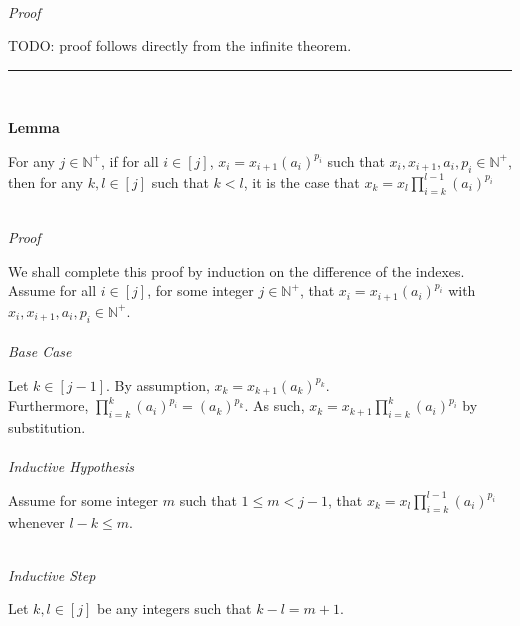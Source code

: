 \documentclass[a4paper,12pt]{article}
\begin{document}
\noindent \\
\textit{Proof}

\noindent TODO: proof follows directly from the infinite theorem.


\begin{center}
\noindent\rule{8cm}{0.4pt}
\end{center}
\noindent \\






\label{lemma:closed_form_of_factorization}
\hypertarget{lemma:closed_form_of_factorization}{}
\begin{tcolorbox}
\textbf{Lemma}

For any $j \in \mathbb{N}^+$, if for all $i \in [j]$, $x_i = x_{i + 1}(a_i)^{p_i}$ such that $x_i, x_{i + 1}, a_i, p_i \in \mathbb{N}^+$, then for any $k, l \in [j]$ such that $k < l$, it is the case that $\displaystyle x_k = x_l \prod_{i = k}^{l - 1} (a_i)^{p_i}$
\end{tcolorbox}

\noindent\\
\textit{Proof}

\noindent We shall complete this proof by induction on the difference of the indexes.\\

\noindent Assume for all $i \in [j]$, for some integer $j \in \mathbb{N}^+$, that $x_i = x_{i + 1}(a_i)^{p_i}$ with $x_i, x_{i + 1}, a_i, p_i \in \mathbb{N}^+$.\\

\noindent\\
\textit{Base Case}

\noindent Let $k \in [j - 1]$. By assumption, $x_k = x_{k + 1}(a_k)^{p_k}$.\\

\noindent Furthermore, $\displaystyle \prod_{i = k}^{k}(a_i)^{p_i} = (a_k)^{p_k}$. As such, $\displaystyle x_k = x_{k + 1} \prod_{i = k}^{k}(a_i)^{p_i}$ by substitution.\\


\noindent \\
\textit{Inductive Hypothesis}

\noindent Assume for some integer $m$ such that $1 \leq m < j - 1$, that $\displaystyle x_k = x_l \prod_{i = k}^{l - 1} (a_i)^{p_i}$ whenever $l - k \leq m$.

\noindent \\
\textit{Inductive Step}

\noindent Let $k, l \in [j]$ be any integers such that $k - l = m + 1$.\\
\end{document}
